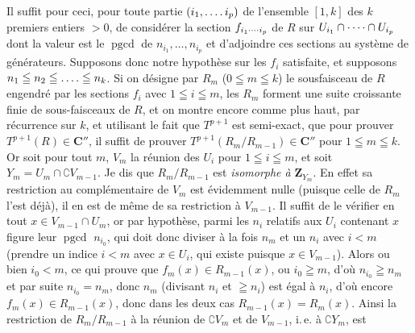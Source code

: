 Il suffit pour ceci, pour toute partie $(i_1,\mathinner{.\,.\,.\,.}i_p)$ de l'ensemble $[1,k]$
des $k$ premiers entiers $>0$, de considérer la section
$f_{i_1\mathinner{\cdotp\cdotp\cdotp\cdotp}i_p}$ de $R$ sur $U_{i_1}\cap\mathinner{\cdotp\cdotp\cdotp\cdotp}\cap U_{i_p}$ dont la valeur
est le $\operatorname{pgcd}$ de $n_{i_1},\ldots,n_{i_p}$ et d'adjoindre ces
sections au système de générateurs.
Supposons donc notre hypothèse sur les $f_i$ satisfaite, et supposons
$n_1\leqq n_2\leqq\mathinner{.\,.\,.\,.}\leqq n_k$. Si on désigne par $R_m$ ($0\leqq m\leqq k$)
le sousfaisceau de $R$ engendré par les sections $f_i$ avec
$1\leqq i\leqq m$, les $R_m$ forment une suite croissante finie de
sous-faisceaux de $R$,
et on montre encore comme plus haut, par récurrence sur $k$, et utilisant le
fait que $T^{p+1}$ est semi-exact, que pour prouver $T^{p+1}(R)\in \mathbf C''$, il
suffit de prouver $T^{p+1}(R_m/R_{m-1})\in \mathbf C''$ pour $1\leqq m\leqq k$.
Or soit pour tout $m$, $V_m$ la réunion des $U_i$ pour $1\leqq i\leqq m$, et
soit
$Y_m=U_m\cap \complement V_{m-1}$.
Je dis que $R_m/R_{m-1}$ est \textit{isomorphe à} $\mathbf Z_{Y_m}$.
En effet sa restriction au complémentaire de $V_m$ est évidemment nulle
(puisque celle de $R_m$ l'est déjà), il en est de même de sa restriction à
$V_{m-1}$. Il suffit de le vérifier en tout $x\in V_{m-1}\cap U_m$, or par
hypothèse, parmi les $n_i$ relatifs aux $U_i$ contenant $x$ figure leur
$\operatorname{pgcd}$ $n_{i_0}$, qui doit donc diviser à la fois $n_m$ et un
$n_i$ avec $i<m$ (prendre un indice $i<m$ avec $x\in U_i$, qui existe puisque
$x\in V_{m-1}$). Alors ou bien $i_0<m$, ce qui prouve que
$f_m(x)\in R_{m-1}(x)$, ou $i_0\geqq m$, d'où $n_{i_0}\geqq n_m$ et par suite
$n_{i_0}=n_m$, donc $n_m$ (divisant $n_i$ et $\geqq n_i$) est égal à $n_i$,
d'où encore $f_m(x)\in R_{m-1}(x)$, donc dans les deux cas
$R_{m-1}(x)=R_m(x)$. Ainsi la restriction de $R_m/R_{m-1}$ à la réunion de
$\complement V_m$ et de $V_{m-1}$, i.\,e. à $\complement Y_m$, est

